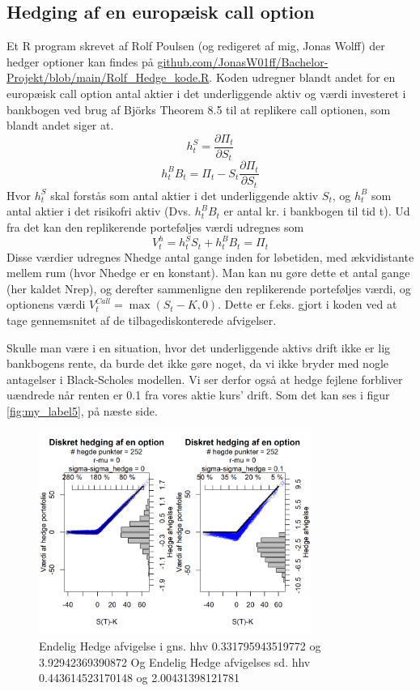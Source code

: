 \documentclass{article}
\theoremstyle{definition}
\theoremstyle{remark}
\begin{document}
\subsection{Hedging af en europæisk call option}
Et R program skrevet af Rolf Poulsen (og redigeret af mig, Jonas Wolff) der hedger optioner kan findes på \href{https://github.com/JonasW01ff/Bachelor-Projekt/blob/main/Rolf_Hedge_kode.R}{github.com/JonasW01ff/Bachelor-Projekt/blob/main/Rolf\_Hedge\_kode.R}. Koden udregner blandt andet for en europæisk call option antal aktier i det underliggende aktiv og værdi investeret i bankbogen ved brug af Björks Theorem 8.5 \cite{Bjork2020} til at replikere call optionen, som blandt andet siger at.
$$h^S_t=\frac{\partial \Pi_t}{\partial S_t}$$
$$h^B_tB_t=\Pi_t-S_t\frac{\partial \Pi_t}{\partial S_t}$$
Hvor $h^S_t$ skal forstås som antal aktier i det underliggende aktiv $S_t$, og $h^B_t$ som antal aktier i det risikofri aktiv (Dvs. $h^B_tB_t$ er antal kr. i bankbogen til tid t). Ud fra det kan den replikerende porteføljes værdi udregnes som
$$V^h_t=h^S_tS_t+h^B_tB_t=\Pi_t$$
Disse værdier udregnes Nhedge antal gange inden for løbetiden, med ækvidistante mellem rum (hvor Nhedge er en konstant). Man kan nu gøre dette et antal gange (her kaldet Nrep), og derefter sammenligne den replikerende porteføljes værdi, og optionens værdi $V^{Call}_t=\max(S_t-K,0)$. Dette er f.eks. gjort i koden ved at tage gennemsnitet af de tilbagediskonterede afvigelser. 

Skulle man være i en situation, hvor det underliggende aktivs drift ikke er lig bankbogens rente, da burde det ikke gøre noget, da vi ikke bryder med nogle antagelser i Black-Scholes modellen. Vi ser derfor også at hedge fejlene forbliver uændrede når renten er 0.1 fra vores aktie kurs' drift. Som det kan ses i figur \ref{fig:my_label5}, på næste side.
\begin{figure}
    \centering
    \includegraphics[width=3.5in]{Overleaf/1 opttype_standard_sigma.png}
    \caption{Endelig Hedge afvigelse i gns. hhv 0.331795943519772 og 3.92942369390872 Og Endelig Hedge afvigelses sd. hhv 0.443614523170148 og 2.00431398121781}
    \label{fig:my_label4}
\end{figure}
\end{document}
